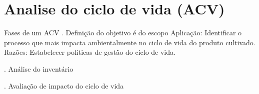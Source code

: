 \section{Analise do ciclo de vida (ACV)}

Fases de um ACV
. Definição do objetivo é do escopo
Aplicação: Identificar o processo que mais impacta ambientalmente no ciclo de vida do produto cultivado.
Razões: Estabelecer políticas de gestão do ciclo de vida.

. Análise do inventário

. Avaliação de impacto do ciclo de vida